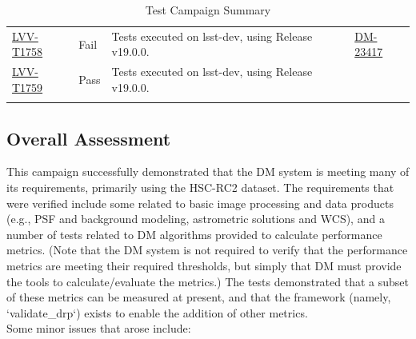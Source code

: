 \documentclass[DM,lsstdraft,STR,toc]{lsstdoc}
\begin{document}
\begin{longtable}{p{2cm}p{2.5cm}p{9cm}p{2.5cm}}
\begin{minipage}[]{9cm}
    \medskip
    \end{minipage}
    &
    \\\hline
\href{https://jira.lsstcorp.org/secure/Tests.jspa#/testCase/LVV-T1758}{LVV-T1758}
    & Fail &
    \begin{minipage}[]{9cm}
    \smallskip
     Tests executed on lsst-dev, using Release v19.0.0.

    \medskip
    \end{minipage}
    &
          \href{https://jira.lsstcorp.org/browse/DM-23417}{DM-23417}
    \\\hline
\href{https://jira.lsstcorp.org/secure/Tests.jspa#/testCase/LVV-T1759}{LVV-T1759}
    & Pass &
    \begin{minipage}[]{9cm}
    \smallskip
     Tests executed on lsst-dev, using Release v19.0.0.

    \medskip
    \end{minipage}
    &
    \\\hline
\caption{Test Campaign Summary}
\label{table:summary}
\end{longtable}

\subsection{Overall Assessment}
\label{sect:overallassessment}

 This campaign successfully demonstrated that the DM system is meeting
many of its requirements, primarily using the HSC-RC2 dataset. The
requirements that were verified include some related to basic image
processing and data products (e.g., PSF and background modeling,
astrometric solutions and WCS), and a number of tests related to DM
algorithms provided to calculate performance metrics. (Note that the DM
system is not required to verify that the performance metrics are
meeting their required thresholds, but simply that DM must provide the
tools to calculate/evaluate the metrics.) The tests demonstrated that a
subset of these metrics can be measured at present, and that the
framework (namely, `validate\_drp`) exists to enable the addition of
other metrics.\\[2\baselineskip]Some minor issues that arose include:
\end{document}
